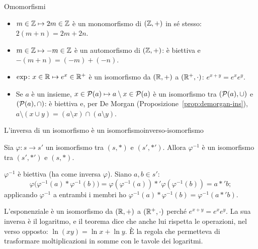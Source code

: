 \begin{esempio}{Omomorfismi}
    \begin{itemize}
        \item $m \in \mathbb{Z} \mapsto 2m \in \mathbb{Z}$ è un monomorfismo di $(\mathbb{Z}, +)$ in sé stesso: $2(m + n) = 2m + 2n$.
        \item $m \in \mathbb{Z} \mapsto -m \in \mathbb{Z}$ è un automorfismo di $(\mathbb{Z}, +)$: è biettiva e $-(m + n) = (-m) + (-n)$.
        \item $\exp \colon x \in \mathbb{R} \mapsto e^x \in \mathbb{R}^+$ è un isomorfismo da $(\mathbb{R}, +)$ a $(\mathbb{R}^+, \cdot)$: $e^{x + y} = e^x e^y$.
        \item Se $a$ è un insieme, $x \in \mathcal{P}(a) \mapsto a \setminus x \in \mathcal{P}(a)$ è un isomorfismo tra $(\mathcal{P}(a), \cup)$ e $(\mathcal{P}(a), \cap)$:
              è biettiva e, per De Morgan (Proposizione~\ref{prop:demorgan-ins}), $a \setminus (x \cup y) = (a \setminus x) \cap (a \setminus y)$.
    \end{itemize}
\end{esempio}

\begin{concetto}
\begin{Teorema}{L'inversa di un isomorfismo è un isomorfismo}{inverso-isomorfismo}
    \begin{prerequisiti}
    \end{prerequisiti}
    Sia $\varphi \colon s \to s'$ un isomorfismo tra $(s, *)$ e $(s', *')$. Allora $\varphi^{-1}$ è un isomorfismo tra $(s', *')$ e $(s, *)$.
\end{Teorema}
\begin{dimostrazione}
    $\varphi^{-1}$ è biettiva (ha come inversa $\varphi$). Siano $a, b \in s'$:
    \[ \varphi\big(\varphi^{-1}(a) * \varphi^{-1}(b)\big) = \varphi(\varphi^{-1}(a)) *' \varphi(\varphi^{-1}(b)) = a *' b; \]
    applicando $\varphi^{-1}$ a entrambi i membri ho $\varphi^{-1}(a) * \varphi^{-1}(b) = \varphi^{-1}(a *' b)$.
\end{dimostrazione}
\end{concetto}

\begin{spiegazione}
    L'esponenziale è un isomorfismo da $(\mathbb{R}, +)$ a $(\mathbb{R}^+, \cdot)$ perché $e^{x + y} = e^x e^y$. La sua inversa è il logaritmo, e il teorema dice che anche lui
    rispetta le operazioni, nel verso opposto: $\ln(xy) = \ln x + \ln y$. È la regola che permetteva di trasformare moltiplicazioni in somme con le tavole dei logaritmi.
\end{spiegazione}


